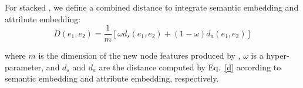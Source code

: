     For stacked \HRGCNs, we define a combined distance to integrate semantic embedding and attribute embedding:
	\begin{equation}
		D(e_1,e_2)=\frac{1}{m}[\omega d_s(e_1,e_2)+(1-\omega)d_a(e_1,e_2)]
	\end{equation}

	where $m$ is the dimension of the new node features produced by \HRGCNs, $\omega$ is a hyper-parameter, and $d_s$ and $d_a$ are the distance computed by Eq.~\ref{d} according to semantic embedding and attribute embedding, respectively.

	
	
